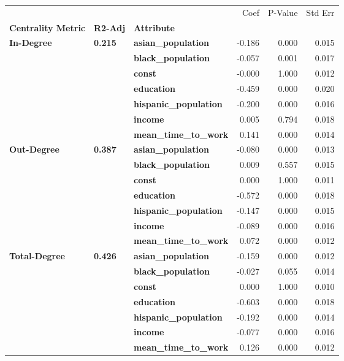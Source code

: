 \begin{tabular}{lllrrr}
\toprule
             &       &                   &   Coef &  P-Value &  Std Err \\
\textbf{Centrality Metric} & \textbf{R2-Adj} & \textbf{Attribute} &        &          &          \\
\midrule
\multirow{7}{*}{\textbf{In-Degree}} & \multirow{7}{*}{\textbf{0.215}} & \textbf{asian\_population} & -0.186 &    0.000 &    0.015 \\
             &       & \textbf{black\_population} & -0.057 &    0.001 &    0.017 \\
             &       & \textbf{const} & -0.000 &    1.000 &    0.012 \\
             &       & \textbf{education} & -0.459 &    0.000 &    0.020 \\
             &       & \textbf{hispanic\_population} & -0.200 &    0.000 &    0.016 \\
             &       & \textbf{income} &  0.005 &    0.794 &    0.018 \\
             &       & \textbf{mean\_time\_to\_work} &  0.141 &    0.000 &    0.014 \\
\cline{1-6}
\cline{2-6}
\multirow{7}{*}{\textbf{Out-Degree}} & \multirow{7}{*}{\textbf{0.387}} & \textbf{asian\_population} & -0.080 &    0.000 &    0.013 \\
             &       & \textbf{black\_population} &  0.009 &    0.557 &    0.015 \\
             &       & \textbf{const} &  0.000 &    1.000 &    0.011 \\
             &       & \textbf{education} & -0.572 &    0.000 &    0.018 \\
             &       & \textbf{hispanic\_population} & -0.147 &    0.000 &    0.015 \\
             &       & \textbf{income} & -0.089 &    0.000 &    0.016 \\
             &       & \textbf{mean\_time\_to\_work} &  0.072 &    0.000 &    0.012 \\
\cline{1-6}
\cline{2-6}
\multirow{7}{*}{\textbf{Total-Degree}} & \multirow{7}{*}{\textbf{0.426}} & \textbf{asian\_population} & -0.159 &    0.000 &    0.012 \\
             &       & \textbf{black\_population} & -0.027 &    0.055 &    0.014 \\
             &       & \textbf{const} &  0.000 &    1.000 &    0.010 \\
             &       & \textbf{education} & -0.603 &    0.000 &    0.018 \\
             &       & \textbf{hispanic\_population} & -0.192 &    0.000 &    0.014 \\
             &       & \textbf{income} & -0.077 &    0.000 &    0.016 \\
             &       & \textbf{mean\_time\_to\_work} &  0.126 &    0.000 &    0.012 \\
\bottomrule
\end{tabular}
